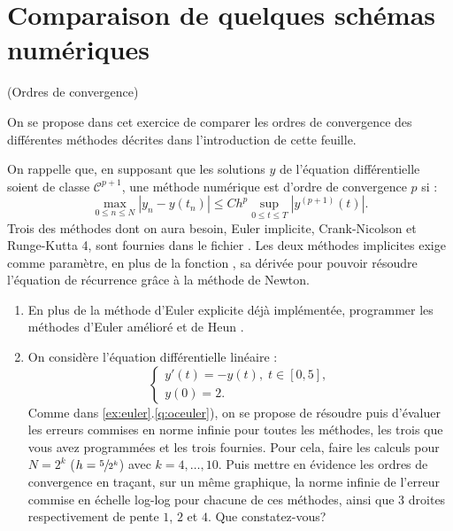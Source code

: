 \documentclass[a4paper,12pt,reqno]{amsart}
\begin{document}
\section{Comparaison  de quelques schémas numériques}


\begin{exo} (Ordres de convergence)

  On se propose dans cet exercice de comparer les ordres de convergence des différentes méthodes décrites dans l'introduction de cette feuille.

  On rappelle que, en supposant que les solutions $y$ de l'équation différentielle soient de classe ${\mathcal{C}}^{p+1}$, une méthode numérique est d'ordre de convergence $p$ si :
    $$
      \max_{0 \leq n \leq N} |y_n-y(t_n)|\leq C h^p \sup_{0 \leq t \leq T} |y^{(p+1)}(t)|.
    $$
  Trois des méthodes dont on aura besoin, Euler implicite, Crank-Nicolson et Runge-Kutta 4, sont fournies dans le fichier . Les deux méthodes implicites exige comme paramètre, en plus de la fonction , sa dérivée  pour pouvoir résoudre l'équation de récurrence grâce à la méthode de Newton.
  \begin{enumerate}
    \item
    En plus de la méthode d'Euler explicite déjà implémentée, programmer les méthodes d'Euler amélioré  et de Heun .
    \item On considère l'équation différentielle linéaire :
      $$
        \begin{cases}
          y'(t) = -y(t), \; t \in [0,5],\\
          y(0) = 2.
        \end{cases}
      $$
    Comme dans \ref{ex:euler}.\ref{q:oceuler}), on se propose de résoudre puis d'évaluer les erreurs commises en norme infinie pour toutes les méthodes, les trois que vous avez programmées et les trois fournies.
    Pour cela, faire les calculs pour $N=2^{k}$ ($h=\sfrac{5}{2^{k}}$) avec $k=4,\dots,10$. Puis mettre en évidence  les ordres de convergence en traçant, sur un même graphique, la norme infinie de l'erreur commise en échelle \og{}log-log\fg{} pour chacune de ces méthodes, ainsi que 3 droites respectivement de pente $1$, $2$ et $4$.\newline
    Que constatez-vous?
  \end{enumerate}
\end{exo}
\end{document}
